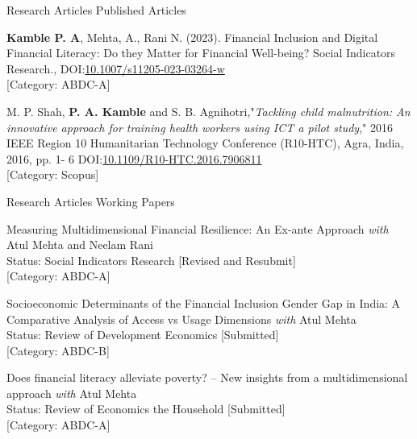 

\begin{cventries}

\cventry
{Research Articles} %
{Published Articles} %
{} %
{} %
{ %
\begin{cvitems}
\item {\textbf{Kamble P. A}, Mehta, A., Rani N. (2023). Financial Inclusion and Digital Financial Literacy: Do they Matter for Financial Well-being? Social Indicators Research., DOI:\href{https://doi.org/10.1007/s11205-023-03264-w}{\space \color{blue}10.1007/s11205-023-03264-w}}\\ 
{\color{red}[Category: ABDC-A]}
\item {M. P. Shah, \textbf{P. A. Kamble} and S. B. Agnihotri,"\textit{Tackling child malnutrition: An innovative approach for training health workers using ICT a pilot study}," 2016 IEEE Region 10 Humanitarian Technology Conference (R10-HTC), Agra, India, 2016, pp. 1- 6 DOI:\href{https://ieeexplore.ieee.org/abstract/document/7906811}{\space \color{blue}10.1109/R10-HTC.2016.7906811}}\\ 
{\color{red}[Category: Scopus]}
\end{cvitems}
}
\cventry
{Research Articles} %
{Working Papers} %
{} %
{} %
{ %
\begin{cvitems}
\item Measuring Multidimensional Financial Resilience: An Ex-ante Approach \textit{with} Atul Mehta and Neelam Rani\\
Status: Social Indicators Research [Revised and Resubmit]\\
{\color{red}[Category: ABDC-A]}
\item Socioeconomic Determinants of the Financial Inclusion Gender Gap in India: A Comparative Analysis of Access vs Usage Dimensions \textit{with} Atul Mehta \\
Status: Review of Development Economics [Submitted] \\ 
{\color{red}[Category: ABDC-B]}
\item Does financial literacy alleviate poverty? – New insights from a multidimensional approach \textit{with} Atul Mehta \\
Status: Review of Economics the Household [Submitted] \\
{\color{red}[Category: ABDC-A]}
\end{cvitems}
}
\end{cventries}

